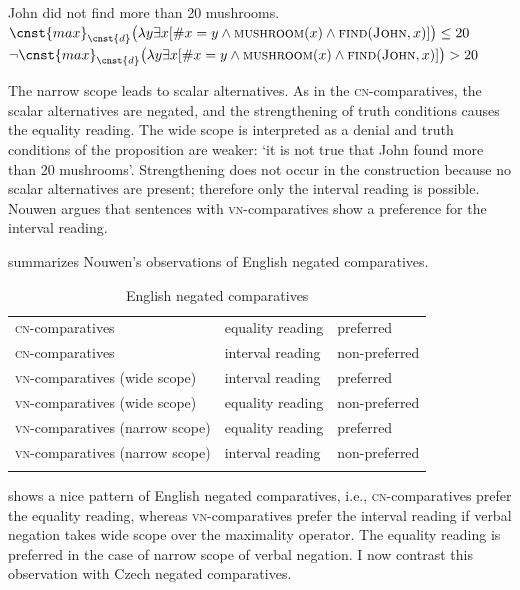 \documentclass[output=paper,
]{langscibook}
\begin{document}
\ea  \label{ex:ver} John did not find more than 20 mushrooms. 
	\ea $\cnst{max}_{\cnst{d}}\big(\lambda y\exists x[\#x=y \wedge \textsc{mushroom}(x) \wedge \textsc{find}(\textsc{John},x)]\big) \leq 20$ \label{ex:eng_exh}
	\ex $\neg\cnst{max}_{\cnst{d}}\big(\lambda y\exists x[\#x=y \wedge \textsc{mushroom}(x) \wedge \textsc{find}(\textsc{John},x)]\big) > 20$ \label{ex:eng_int}
\z
\z

\noindent The narrow scope leads to scalar alternatives. As in the \textsc{cn-}comparatives, the scalar alternatives are negated, and the strengthening of truth conditions causes the equality reading. The wide scope is interpreted as a denial and truth conditions of the proposition are weaker: `it is not true that John found more than 20 mushrooms'. Strengthening does not occur in the construction because no scalar alternatives are present; therefore only the interval reading is possible. Nouwen argues that sentences with \textsc{vn-}comparatives show a preference for the interval reading. 

 summarizes Nouwen's observations of English negated comparatives.

\begin{table}
\caption{English negated comparatives}
\label{tab:1:eng_comp}
 \begin{tabular}{lll} 
  \lsptoprule
  \textsc{cn-}comparatives & equality reading & preferred\\
  \textsc{cn-}comparatives & interval reading & non-preferred\\
   \textsc{vn-}comparatives (wide scope) & interval reading & preferred\\
    \textsc{vn-}comparatives (wide scope) & equality reading & non-preferred\\
  \textsc{vn-}comparatives (narrow scope) & equality reading & preferred\\
  \textsc{vn-}comparatives (narrow scope) & interval reading & non-preferred\\
\lspbottomrule 
 
  \end{tabular}
  \end{table}
  

 shows a nice pattern of English negated comparatives, i.e., \textsc{cn-}comparatives prefer the equality reading, whereas \textsc{vn-}comparatives prefer the interval reading if verbal negation takes wide scope over the maximality operator. The equality reading is preferred in the case of narrow scope of verbal negation. I now contrast this observation with Czech negated comparatives.
\end{document}
